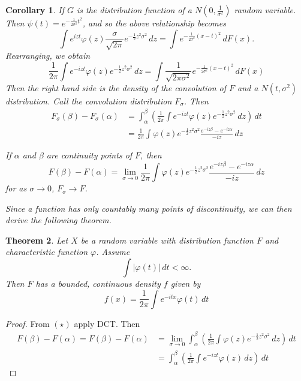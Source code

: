 \documentclass[10pt, oneside, reqno]{amsart}
\theoremstyle{plain}%
\newtheorem{thm}{Theorem}[section]
\newtheorem{cor}[thm]{Corollary}
\theoremstyle{definition}
\theoremstyle{remark}
\renewcommand{\phi}{\varphi}
\begin{document}
\begin{cor}
	If $G$ is the distribution function of a $N(0, \frac{1}{\sigma^2})$ random variable.  Then $\psi(t) = e^{-\frac{1}{2\sigma^2} t^2}$, and so the above relationship becomes \[
		\int e^{izt} \phi(z) \frac{\sigma}{\sqrt{2\pi}} e^{-\frac{1}{2}z^2 \sigma^2} \, dz = \int e^{-\frac{1}{2\sigma^2}(x-t)^2} \, dF(x).
	\]  Rearranging, we obtain \[
		\frac{1}{2\pi} \int e^{-izt} \phi(z) e^{-\frac{1}{2} z^2 \sigma^2} \, dz = \int \frac{1}{\sqrt{2 \pi \sigma^2}} e^{- \frac{1}{2 \sigma^2}(x - t)^2} \, dF(x)
	\]  Then the right hand side is the density of the convolution of $F$ and a $N(t, \sigma^2)$ distribution.  Call the convolution distribution $F_\sigma$.  Then \begin{align*}
		F_\sigma(\beta) - F_\sigma(\alpha) &= \int_\alpha^\beta \left( 	\frac{1}{2\pi} \int e^{-izt} \phi(z) e^{-\frac{1}{2} z^2 \sigma^2} \, dz \right) \, dt \\
		&= \frac{1}{2\pi} \int \phi(z) e^{-\frac{1}{2} z^2 \sigma^2} \frac{e^{-iz\beta} - e^{-iz\alpha}}{-iz} \, dz
	\end{align*}
	
	If $\alpha$ and $\beta$ are continuity points of $F$, then \[
		F(\beta) - F(\alpha) = \lim_{\sigma \rightarrow 0} \frac{1}{2 \pi} \int \phi(z) e^{-\frac{1}{2} z^2 \sigma^2} \frac{e^{-iz\beta} - e^{-iz\alpha}}{-iz} \, dz \tag{$\star$}
	\] for as $\sigma \rightarrow 0$, $F_\sigma \rightarrow F$.  
	
	Since a function has only countably many points of discontinuity, we can then derive the following theorem.
\end{cor}

\begin{thm}
	Let $X$ be a random variable with distribution function $F$ and characteristic function $\phi$.  Assume \[
		\int | \phi(t) | \, dt < \infty.
	\]  Then $F$ has a bounded, continuous density $f$ given by \[
		f(x) = \frac{1}{2\pi} \int e^{-itx} \phi(t) \, dt
	\]
\end{thm}

\begin{proof}
	From $(\star)$ apply DCT.  Then \begin{align*}
		F(\beta) - F(\alpha) = F(\beta) - F(\alpha) &= \lim_{\sigma \rightarrow 0} \int_\alpha^\beta \left( \frac{1}{2 \pi} \int \phi(z) e^{-\frac{1}{2} z^2 \sigma^2} \, dz \right) \, dt \\
		&= \int_\alpha^\beta \left( \frac{1}{2 \pi} \int e^{-izt} \phi(z) \, dz \right) \, dt 
	\end{align*}
\end{proof}
\end{document}
